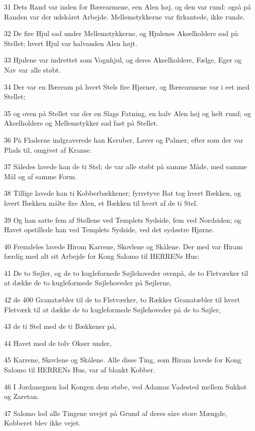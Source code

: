 \par 31 Dets Rand var inden for Bærearmene, een Alen høj, og den var rund: også på Randen var der udskåret Arbejde. Mellemstykkerne var firkantede, ikke runde.
\par 32 De fire Hjul sad under Mellemstykkerne, og Hjulenes Akselholdere sad på Stellet; hvert Hjul var halvanden Alen højt.
\par 33 Hjulene var indrettet som Vognhjul, og deres Akselholdere, Fælge, Eger og Nav var alle støbt.
\par 34 Der var en Bæream på hvert Stels fire Hjørner, og Bærearmene var i eet med Stellet;
\par 35 og oven på Stellet var der en Slags Fatning, en halv Alen høj og helt rund; og Akselholdere og Mellemstykker sad fast på Stellet.
\par 36 På Fladerne indgraverede han Keruber, Løver og Palmer, efter som der var Plads til, omgivet af Kranse.
\par 37 Således lavede han de ti Stel; de var alle støbt på samme Måde, med samme Mål og af samme Form.
\par 38 Tillige lavede han ti Kobberbækkener; fyrretyve Bat tog hvert Bækken, og hvert Bækken målte fire Alen, et Bækken til hvert af de ti Stel.
\par 39 Og han satte fem af Stellene ved Templets Sydside, fem ved Nordsiden; og Havet opstillede han ved Templets Sydside, ved det sydøstre Hjørne.
\par 40 Fremdeles lavede Hirom Karrene, Skovlene og Skålene. Der med var Hiram færdig med alt sit Arbejde for Kong Salomo til HERRENs Hus:
\par 41 De to Søjler, og de to kuglefornede Søjlehoveder ovenpå, de to Fletværker til at dække de to kugleformede Søjlehoveder på Søjlerne,
\par 42 de 400 Granatæbler til de to Fletværker, to Rækker Granatæbler til hvert Fletværk til at dække de to kugleformede Søjlehoveder på de to Søjler,
\par 43 de ti Stel med de ti Bækkener på,
\par 44 Havet med de tolv Okser under,
\par 45 Karrene, Skovlene og Skålene. Alle disse Ting, som Hiram lavede for Kong Salomo til HERRENs Hus, var af blankt Kobber.
\par 46 I Jordanegnen lod Kongen dem støbe, ved Adamas Vadested mellem Sukkot og Zaretan.
\par 47 Salomo lod alle Tingene uvejet på Grund af deres såre store Mængde, Kobberet blev ikke vejet.
